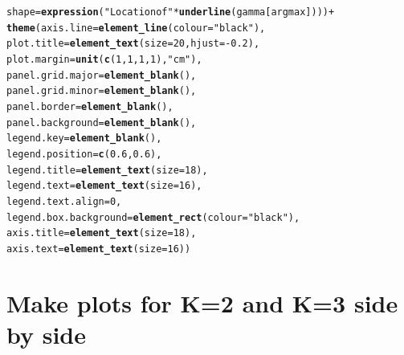 \documentclass{article}\usepackage[]{graphicx}\usepackage[]{color}
\makeatletter
\newcommand{\hlnum}[1]{\textcolor[rgb]{0.686,0.059,0.569}{#1}}%
\newcommand{\hlstr}[1]{\textcolor[rgb]{0.192,0.494,0.8}{#1}}%
\newcommand{\hlopt}[1]{\textcolor[rgb]{0,0,0}{#1}}%
\newcommand{\hlstd}[1]{\textcolor[rgb]{0.345,0.345,0.345}{#1}}%
\newcommand{\hlkwc}[1]{\textcolor[rgb]{0.333,0.667,0.333}{#1}}%
\newcommand{\hlkwd}[1]{\textcolor[rgb]{0.737,0.353,0.396}{\textbf{#1}}}%
\newenvironment{kframe}{%
 \def\at@end@of@kframe{}%
 \ifinner\ifhmode%
  \def\at@end@of@kframe{\end{minipage}}%
  \begin{minipage}{\columnwidth}%
 \fi\fi%
 \def\FrameCommand##1{\hskip\@totalleftmargin \hskip-\fboxsep
 \colorbox{shadecolor}{##1}\hskip-\fboxsep
     \hskip-\linewidth \hskip-\@totalleftmargin \hskip\columnwidth}%
 \MakeFramed {\advance\hsize-\width
   \@totalleftmargin\z@ \linewidth\hsize
   \@setminipage}}%
 {\par\unskip\endMakeFramed%
 \at@end@of@kframe}
\newenvironment{knitrout}{}{} %
\makeatother
\begin{document}
\begin{knitrout}
\begin{kframe}
\begin{alltt}
       \hlkwc{shape}\hlstd{=}\hlkwd{expression}\hlstd{(}\hlstr{"Location of "} \hlopt{*} \hlkwd{underline}\hlstd{(gamma[argmax])))} \hlopt{+}
  \hlkwd{theme}\hlstd{(}\hlkwc{axis.line} \hlstd{=} \hlkwd{element_line}\hlstd{(}\hlkwc{colour} \hlstd{=} \hlstr{"black"}\hlstd{),}
        \hlkwc{plot.title} \hlstd{=} \hlkwd{element_text}\hlstd{(}\hlkwc{size} \hlstd{=} \hlnum{20}\hlstd{,} \hlkwc{hjust} \hlstd{=} \hlopt{-}\hlnum{0.2}\hlstd{),}
        \hlkwc{plot.margin}\hlstd{=}\hlkwd{unit}\hlstd{(}\hlkwd{c}\hlstd{(}\hlnum{1}\hlstd{,}\hlnum{1}\hlstd{,}\hlnum{1}\hlstd{,}\hlnum{1}\hlstd{),}\hlstr{"cm"}\hlstd{),}
        \hlkwc{panel.grid.major} \hlstd{=} \hlkwd{element_blank}\hlstd{(),}
        \hlkwc{panel.grid.minor} \hlstd{=} \hlkwd{element_blank}\hlstd{(),}
        \hlkwc{panel.border} \hlstd{=} \hlkwd{element_blank}\hlstd{(),}
        \hlkwc{panel.background} \hlstd{=} \hlkwd{element_blank}\hlstd{(),}
        \hlkwc{legend.key} \hlstd{=} \hlkwd{element_blank}\hlstd{(),}
        \hlkwc{legend.position}\hlstd{=}\hlkwd{c}\hlstd{(}\hlnum{0.6}\hlstd{,}\hlnum{0.6}\hlstd{),}
        \hlkwc{legend.title} \hlstd{=} \hlkwd{element_text}\hlstd{(}\hlkwc{size}\hlstd{=}\hlnum{18}\hlstd{),}
        \hlkwc{legend.text} \hlstd{=} \hlkwd{element_text}\hlstd{(}\hlkwc{size}\hlstd{=}\hlnum{16}\hlstd{),}
        \hlkwc{legend.text.align} \hlstd{=} \hlnum{0}\hlstd{,}
        \hlkwc{legend.box.background} \hlstd{=} \hlkwd{element_rect}\hlstd{(}\hlkwc{colour} \hlstd{=} \hlstr{"black"}\hlstd{),}
        \hlkwc{axis.title} \hlstd{=} \hlkwd{element_text}\hlstd{(}\hlkwc{size}\hlstd{=}\hlnum{18}\hlstd{),}
        \hlkwc{axis.text} \hlstd{=} \hlkwd{element_text}\hlstd{(}\hlkwc{size}\hlstd{=}\hlnum{16}\hlstd{))}
\end{alltt}
\end{kframe}
\end{knitrout}

\section{Make plots for K=2 and K=3 side by side}
\end{document}
